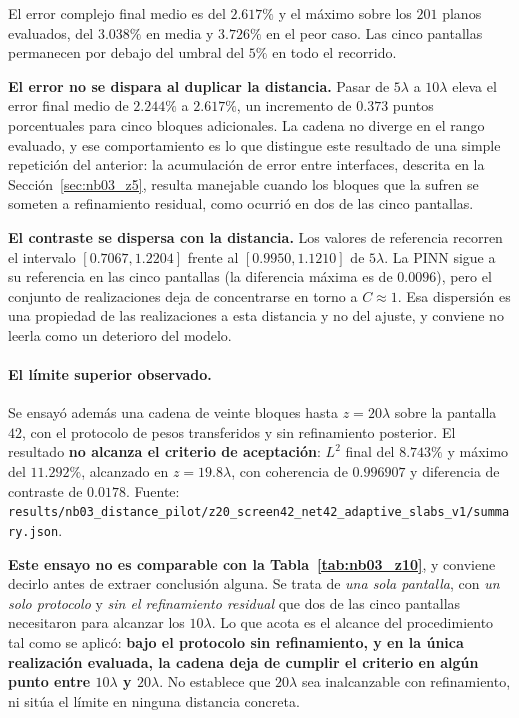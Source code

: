 El error complejo final medio es del $2.617\%$ y el máximo sobre los $201$
planos evaluados, del $3.038\%$ en media y $3.726\%$ en el peor caso. Las cinco
pantallas permanecen por debajo del umbral del $5\%$ en todo el recorrido.

\textbf{El error no se dispara al duplicar la distancia.} Pasar de $5\lambda$ a
$10\lambda$ eleva el error final medio de $2.244\%$ a $2.617\%$, un incremento
de $0.373$ puntos porcentuales para cinco bloques adicionales. La cadena no
diverge en el rango evaluado, y ese comportamiento es lo que distingue este
resultado de una simple repetición del anterior: la acumulación de error entre
interfaces, descrita en la Sección~\ref{sec:nb03_z5}, resulta manejable cuando
los bloques que la sufren se someten a refinamiento residual, como ocurrió en
dos de las cinco pantallas.

\textbf{El contraste se dispersa con la distancia.} Los valores de referencia
recorren el intervalo $[0.7067, 1.2204]$ frente al $[0.9950, 1.1210]$ de
$5\lambda$. La PINN sigue a su referencia en las cinco pantallas (la
diferencia máxima es de $0.0096$), pero el conjunto de realizaciones deja de
concentrarse en torno a $C\approx1$. Esa dispersión es una propiedad de las
realizaciones a esta distancia y no del ajuste, y conviene no leerla como un
deterioro del modelo.

\paragraph{El límite superior observado.} Se ensayó además una cadena de veinte
bloques hasta $z=20\lambda$ sobre la pantalla $42$, con el protocolo de pesos
transferidos y sin refinamiento posterior. El resultado \textbf{no alcanza el
criterio de aceptación}: $L^2$ final del $8.743\%$ y máximo del $11.292\%$,
alcanzado en $z=19.8\lambda$, con coherencia de $0.996907$ y diferencia de
contraste de $0.0178$. Fuente:
\texttt{results/nb03\_distance\_pilot/z20\_screen42\_net42\_adaptive\_slabs\_v1/summary.json}.

\textbf{Este ensayo no es comparable con la Tabla~\ref{tab:nb03_z10}}, y
conviene decirlo antes de extraer conclusión alguna. Se trata de \emph{una sola
pantalla}, con \emph{un solo protocolo} y \emph{sin el refinamiento residual}
que dos de las cinco pantallas necesitaron para alcanzar los $10\lambda$. Lo
que acota es el alcance del procedimiento tal como se aplicó: \textbf{bajo el
protocolo sin refinamiento, y en la única realización evaluada, la cadena deja
de cumplir el criterio en algún punto entre $10\lambda$ y $20\lambda$}. No
establece que $20\lambda$ sea inalcanzable con refinamiento, ni sitúa el límite
en ninguna distancia concreta.

